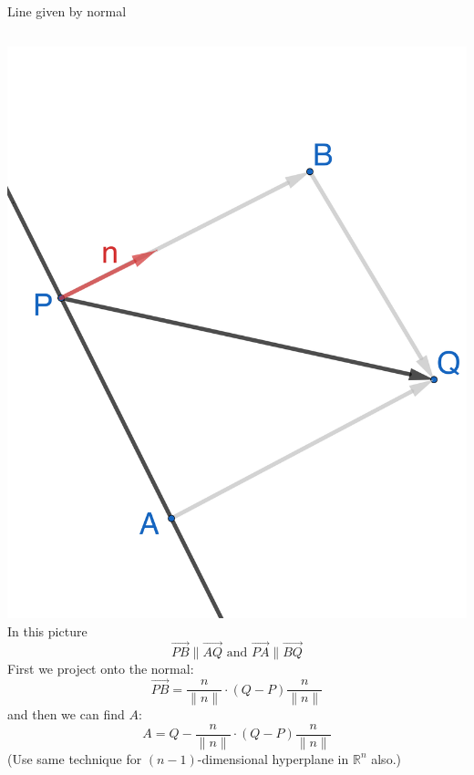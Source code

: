 \documentclass{beamer}
\begin{document}
\begin{frame}{Line given by normal}
\begin{columns}
    \hspace{-1cm}
    \includegraphics[scale=0.6]{2d-normal-closest.png}
    In this picture
    \[
        \overrightarrow{PB}\|\overrightarrow{AQ}\text{ and } \overrightarrow{PA}\| \overrightarrow{BQ}
    \]  
    First we project onto the normal:
    \begin{equation*}
        \overrightarrow {PB} = \frac{n}{\|n\|}\cdot (Q-P)\frac{n}{\|n\|}
    \end{equation*}
    and then we can find $A$:
    \begin{equation*}
        A = Q - \frac{n}{\|n\|}\cdot (Q-P)\frac{n}{\|n\|}
    \end{equation*}
    (Use same technique for $(n-1)$-dimensional hyperplane in $\mathbb R^n$ also.)
\end{columns}
\end{frame}
\end{document}

